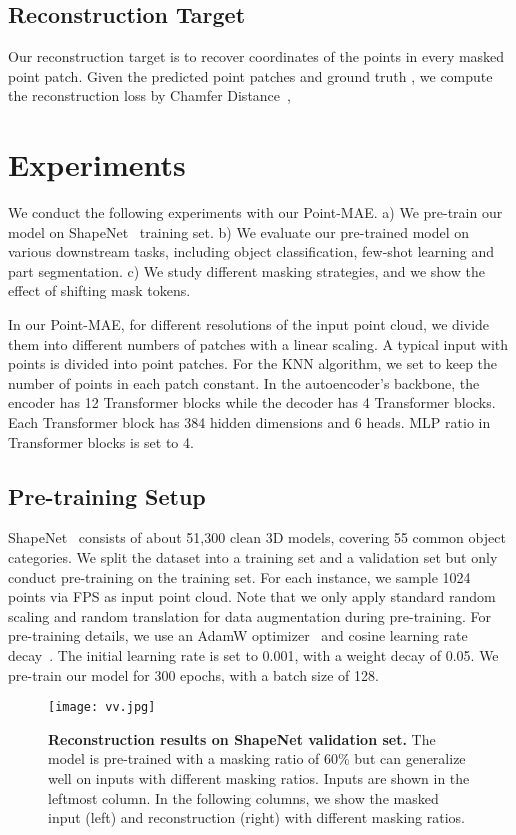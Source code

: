 \documentclass[runningheads]{llncs}
\begin{document}
\subsection{Reconstruction Target}
Our reconstruction target is to recover coordinates of the points in every masked point patch. Given the predicted point patches  and ground truth , we compute the reconstruction loss by  Chamfer Distance~\cite{cd},



\section{Experiments}
We conduct the following experiments with our Point-MAE. a) We pre-train our model on ShapeNet~\cite{shapenet} training set. b) We evaluate our pre-trained model on various downstream tasks, including object classification, few-shot learning and part segmentation. c) We study different masking strategies, and we show the effect of shifting mask tokens.

In our Point-MAE, for different resolutions of the input point cloud, we divide them into different numbers of patches with a linear scaling. A typical input with  points is divided into  point patches. For the KNN algorithm, we set  to keep the number of points in each patch constant. In the autoencoder's backbone, the encoder has 12 Transformer blocks while the decoder has 4 Transformer blocks. Each Transformer block has 384 hidden dimensions and 6 heads. MLP ratio in Transformer blocks is set to 4.

\subsection{Pre-training Setup}

ShapeNet~\cite{shapenet} consists of about 51,300 clean 3D models, covering 55 common object categories. We split the dataset into a training set and a validation set but only conduct pre-training on the training set. For each instance, we sample 1024 points via FPS as input point cloud. Note that we only apply standard random scaling and random translation for data augmentation during pre-training. For pre-training details, we use an AdamW optimizer~\cite{adamw} and cosine learning rate decay~\cite{cos}. The initial learning rate is set to 0.001, with a weight decay of 0.05. We pre-train our model for 300 epochs, with a batch size of 128.

\begin{figure}
    \centering
    \texttt{[image: vv.jpg]}
    \caption{{\bf Reconstruction results on ShapeNet validation set.}  The model is pre-trained with a masking ratio of 60\% but can generalize well on inputs with different masking ratios. Inputs are shown in the leftmost column. In the following columns, we show the masked input (left) and reconstruction (right) with different masking ratios.}
    \label{fig:pre_vis}
    \vspace{-5mm}
\end{figure}
\end{document}
